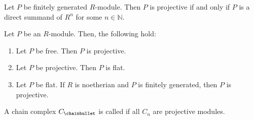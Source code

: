\begin{lemma}
  Let $P$ be finitely generated $R$-module.
  Then  $P$ is projective if and only if  $P$ is a direct summand
  of  $R^n$ for some $n\in \mathbb{N}$.
\end{lemma}

\begin{lemma}
  Let $P$ be an  $R$-module.
  Then, the following hold:
   \begin{enumerate}[h]
     \item Let $P$ be free. Then  $P$ is projective.
     \item Let $P$ be projective. Then  $P$ is flat. 
     \item Let $P$ be flat. If  $R$ is noetherian and  $P$ is
       finitely generated, then  $P$ is projective.
  \end{enumerate}
\end{lemma}

\begin{definition}
  A chain complex $C_\chainbullet $ is called 
  if all $C_n$ are projective modules.
\end{definition}
